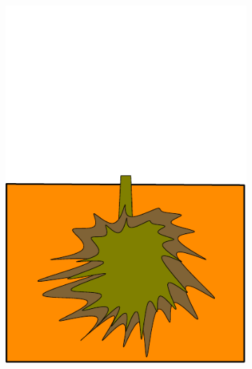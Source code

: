 \documentclass[10pt]{article}
\begin{document}
\begin{figure}
\begin{subfigure}[b]{.1125\linewidth}
\includegraphics[width=1.0\linewidth]{img/tree_pics_5}
\caption{}  %
\label{fig:grow_5}
\end{subfigure}
\begin{subfigure}[b]{.1125\linewidth}
\centering

\end{subfigure}
\end{figure}
\end{document}

